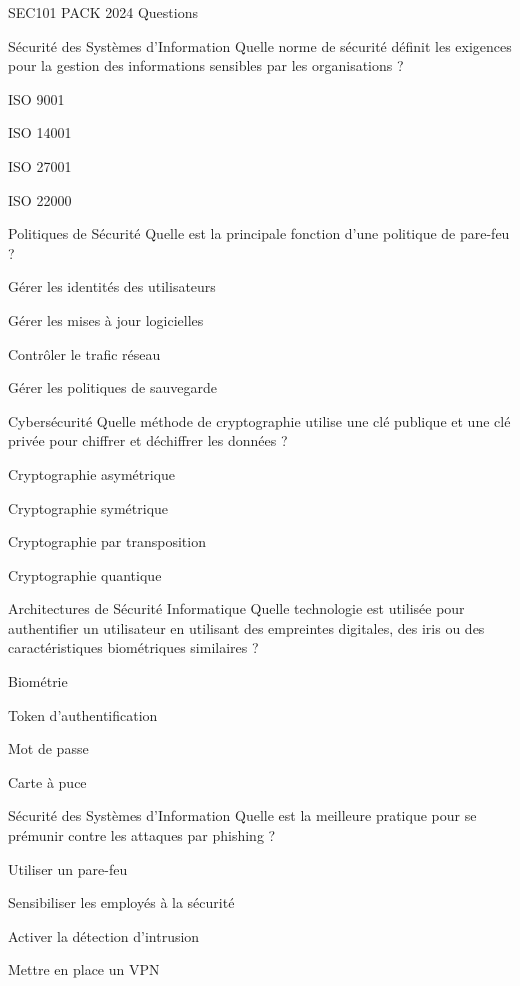 \documentclass[12pt]{article}
\begin{document}
\begin{quiz}{SEC101 PACK 2024 Questions}
  \begin{multi}[points=1]{Sécurité des Systèmes d'Information}
    Quelle norme de sécurité définit les exigences pour la gestion des informations sensibles par les organisations ?
    \item ISO 9001
    \item ISO 14001
    \item* ISO 27001
    \item ISO 22000
  \end{multi}

  \begin{multi}[points=1]{Politiques de Sécurité}
    Quelle est la principale fonction d'une politique de pare-feu ?
    \item Gérer les identités des utilisateurs
    \item Gérer les mises à jour logicielles
    \item* Contrôler le trafic réseau
    \item Gérer les politiques de sauvegarde
  \end{multi}

  \begin{multi}[points=1]{Cybersécurité}
    Quelle méthode de cryptographie utilise une clé publique et une clé privée pour chiffrer et déchiffrer les données ?
    \item* Cryptographie asymétrique
    \item Cryptographie symétrique
    \item Cryptographie par transposition
    \item Cryptographie quantique
  \end{multi}

  \begin{multi}[points=1]{Architectures de Sécurité Informatique}
    Quelle technologie est utilisée pour authentifier un utilisateur en utilisant des empreintes digitales, des iris ou des caractéristiques biométriques similaires ?
    \item* Biométrie
    \item Token d'authentification
    \item Mot de passe
    \item Carte à puce
  \end{multi}

  \begin{multi}[points=1]{Sécurité des Systèmes d'Information}
    Quelle est la meilleure pratique pour se prémunir contre les attaques par phishing ?
    \item Utiliser un pare-feu
    \item* Sensibiliser les employés à la sécurité
    \item Activer la détection d'intrusion
    \item Mettre en place un VPN
  \end{multi}


\end{quiz}
\end{document}
